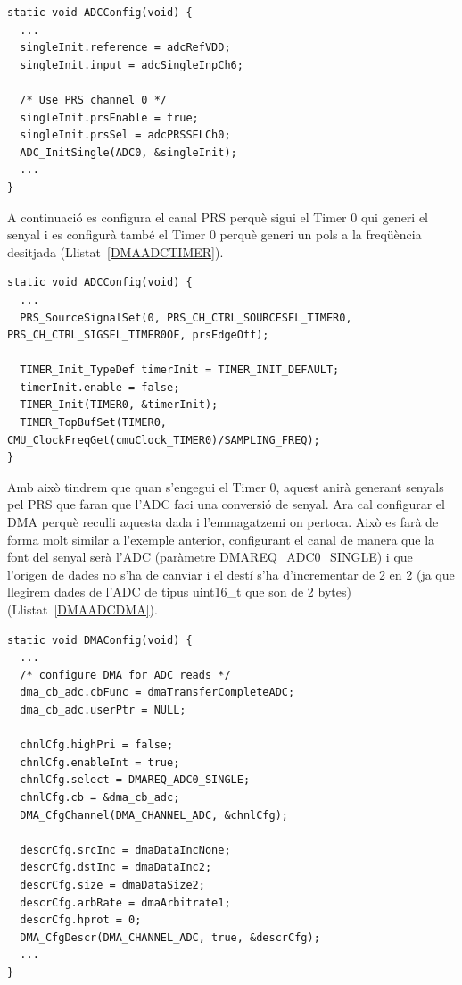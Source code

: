\begin{lstlisting}[style=customc,caption=Configuració de l'ADC perquè funcioni amb el PRS ,label=DMAADCPRS]
static void ADCConfig(void) {
  ...
  singleInit.reference = adcRefVDD;
  singleInit.input = adcSingleInpCh6;
  
  /* Use PRS channel 0 */
  singleInit.prsEnable = true;
  singleInit.prsSel = adcPRSSELCh0;
  ADC_InitSingle(ADC0, &singleInit);
  ...
}
\end{lstlisting}

A continuació es configura el canal PRS perquè sigui el Timer 0 qui generi el senyal i es configurà també el Timer 0 perquè generi un pols a la freqüència desitjada (Llistat~\ref{DMAADCTIMER}).

\begin{lstlisting}[style=customc,caption=Configuració del Timer0 perquè funcioni amb el PRS ,label=DMAADCTIMER]
static void ADCConfig(void) {
  ...
  PRS_SourceSignalSet(0, PRS_CH_CTRL_SOURCESEL_TIMER0, PRS_CH_CTRL_SIGSEL_TIMER0OF, prsEdgeOff);

  TIMER_Init_TypeDef timerInit = TIMER_INIT_DEFAULT;
  timerInit.enable = false;
  TIMER_Init(TIMER0, &timerInit);
  TIMER_TopBufSet(TIMER0, CMU_ClockFreqGet(cmuClock_TIMER0)/SAMPLING_FREQ);
}
\end{lstlisting}

Amb això tindrem que quan s'engegui el Timer 0, aquest anirà generant senyals pel PRS que faran que l'ADC faci una conversió de senyal. Ara cal configurar el DMA perquè reculli aquesta dada i l'emmagatzemi on pertoca. Això es farà de forma molt similar a l'exemple anterior, configurant el canal de manera que la font del senyal serà l'ADC (paràmetre DMAREQ\_ADC0\_SINGLE)  i que l'origen de dades no s'ha de canviar i el destí s'ha d'incrementar de 2 en 2 (ja que llegirem dades de l'ADC de tipus uint16\_t que son de 2 bytes) (Llistat~\ref{DMAADCDMA}).

\begin{lstlisting}[style=customc,caption=Configuració del DMA per obtenir dades de l'ADC, label=DMAADCDMA]
static void DMAConfig(void) {
  ...
  /* configure DMA for ADC reads */
  dma_cb_adc.cbFunc = dmaTransferCompleteADC;
  dma_cb_adc.userPtr = NULL;

  chnlCfg.highPri = false;
  chnlCfg.enableInt = true;
  chnlCfg.select = DMAREQ_ADC0_SINGLE;
  chnlCfg.cb = &dma_cb_adc;
  DMA_CfgChannel(DMA_CHANNEL_ADC, &chnlCfg);

  descrCfg.srcInc = dmaDataIncNone;
  descrCfg.dstInc = dmaDataInc2;
  descrCfg.size = dmaDataSize2;
  descrCfg.arbRate = dmaArbitrate1;
  descrCfg.hprot = 0;
  DMA_CfgDescr(DMA_CHANNEL_ADC, true, &descrCfg);
  ...
}
\end{lstlisting}

